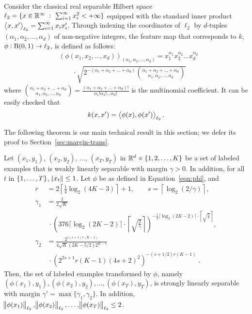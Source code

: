 Consider the
classical real separable Hilbert space $\ell_2 = \{ x \in \mathbb{R}^\infty ~:~
\sum_{i=1}^\infty x_i^2 < + \infty \}$ equipped with the standard inner product
$\left\langle x, x' \right\rangle_{\ell_2} = \sum_{i=1}^\infty x_i x'_i$.
Through indexing the coordinates of
$\ell_2$ by $d$-tuples $(\alpha_1, \alpha_2, \dots, \alpha_d)$ of non-negative
integers, the feature map that corresponds to $k$, $\phi: \operatorname{B}(0,1) \to \ell_2$, is defined as follows:
\begin{align}
& \left(\phi(x_1, x_2, \dots, x_d)\right)_{(\alpha_1, \alpha_2, \dots, \alpha_d)} = x_1^{\alpha_1} x_2^{\alpha_2} \dots x_d^{\alpha_d} \nonumber \\
& \qquad \cdot \sqrt{2^{-(\alpha_1 + \alpha_2 + \dots + \alpha_d)} \binom{\alpha_1 + \alpha_2 + \dots + \alpha_d}{\alpha_1, \alpha_2, \dots, \alpha_d}}
\label{eqn:phi}
\end{align}
where $\binom{\alpha_1 + \alpha_2 + \dots + \alpha_d}{\alpha_1, \alpha_2, \dots, \alpha_d} = \frac{(\alpha_1 + \alpha_2 + \dots + \alpha_d)!}{\alpha_1! \alpha_2! \dots \alpha_d!}$
is the multinomial coefficient.
It can be easily checked that
\[ k(x,x') = \left\langle \phi(x), \phi(x') \right\rangle_{\ell_2}. \]


The following theorem is our main technical result in this section; we defer its
proof to Section~\ref{sec:margin-trans}.

\begin{theorem}
\label{theorem:margin-transformation}
Let $(x_1, y_1)$, $(x_2, y_2)$, $\dots$, $(x_T, y_T)$ in $\mathbb{R}^d \times \{1,2,\dots,K\}$
be a set of labeled examples that is weakly linearly separable with margin $\gamma > 0$.
In addition, for all $t$ in $\cbr{1,\ldots,T}$, $\norm{x_t} \le 1$.
Let $\phi$ be as defined in Equation~\eqref{eqn:phi}, and
\begin{align*}
r & = 2 \left\lceil \frac{1}{4} \log_2(4K-3) \right\rceil + 1, \quad \quad s = \left \lceil \log_2(2/\gamma) \right \rceil, \\
\gamma_1 & = \frac{1}{2\sqrt{K}}  \\
& \ \cdot \left(376 \lceil \log_2(2K-2) \rceil \cdot \left \lceil \sqrt{\frac{2}{\gamma}} \right \rceil \right)^{-\frac{1}{2} \lceil \log_2(2K-2) \rceil \cdot \left \lceil \sqrt{\frac{2}{\gamma}} \right \rceil}, \\
\gamma_2 & = \frac{2^{s(s+1)r(K-1)} }{4\sqrt{K}(2K-5/2) 2^{K-1}} \\
& \ \cdot \left(2^{2s+1} r(K-1) (4s+2)^2 \right)^{-(s+1/2)r(K-1)} \; .
\end{align*}
Then, the set of labeled examples transformed by $\phi$,
namely $(\phi(x_1), y_1), (\phi(x_2), y_2), \dots,
(\phi(x_T), y_T)$, is strongly linearly separable with margin $\gamma' =
\max\{\gamma_1, \gamma_2\}$. In addition, $\norm{\phi(x_1)}_{\ell_2},
\norm{\phi(x_2)}_{\ell_2}, \dots, \norm{\phi(x_T)}_{\ell_2} \le 2$.
\end{theorem}

